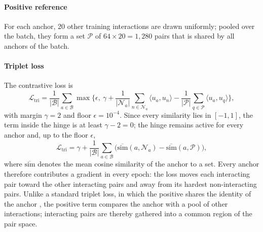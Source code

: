 \documentclass[11pt,letterpaper]{article}
\begin{document}
\paragraph{Positive reference}
For each anchor, 20 other training interactions are drawn uniformly; pooled over the batch, they form a set $\mathcal{P}$ of $64\times20=1{,}280$ pairs that is shared by all anchors of the batch.

\paragraph{Triplet loss}
The contrastive loss is
\begin{equation}
\mathcal{L}_{\text{tri}} = \frac{1}{|\mathcal{B}|}\sum_{a\in\mathcal{B}} \max\!\Big\{\epsilon,\ \gamma + \frac{1}{|\mathcal{N}_a|}\sum_{n\in\mathcal{N}_a} \langle u_a,u_n\rangle - \frac{1}{|\mathcal{P}|}\sum_{q\in\mathcal{P}} \langle u_a,u_q\rangle \Big\},
\label{eq:triplet}
\end{equation}
with margin $\gamma=2$ and floor $\epsilon=10^{-4}$. Since every similarity lies in $[-1,1]$, the term inside the hinge is at least $\gamma-2=0$; the hinge remains active for every anchor and, up to the floor $\epsilon$,
\[
\mathcal{L}_{\text{tri}} = \gamma + \frac{1}{|\mathcal{B}|}\sum_{a\in\mathcal{B}}\Big(\overline{\mathrm{sim}}(a,\mathcal{N}_a) - \overline{\mathrm{sim}}(a,\mathcal{P})\Big),
\]
where $\overline{\mathrm{sim}}$ denotes the mean cosine similarity of the anchor to a set. Every anchor therefore contributes a gradient in every epoch: the loss moves each interacting pair toward the other interacting pairs and away from its hardest non-interacting pairs. Unlike a standard triplet loss, in which the positive shares the identity of the anchor \cite{schroff2015facenet}, the positive term compares the anchor with a pool of other interactions; interacting pairs are thereby gathered into a common region of the pair space.
\end{document}
